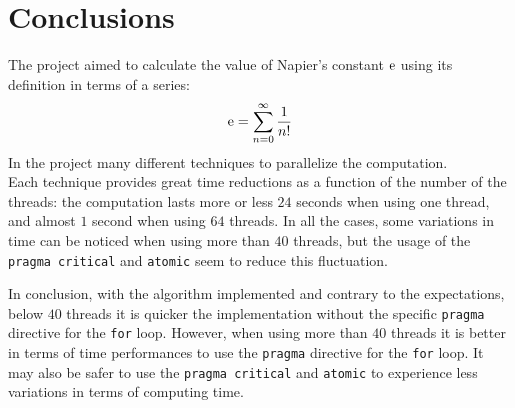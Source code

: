 \documentclass[11pt,a4paper]{article}
\begin{document}
\section{Conclusions}
\par The project aimed to calculate the value of Napier's constant $\operatorname{e}$ using its definition in terms of a series:
$$\operatorname{e} = \sum_{n = 0} ^{\infty} \frac{1}{n!}$$
In the project many different techniques to parallelize the computation.\\
Each technique provides great time reductions as a function of the number of the threads: the computation lasts more or less $24$ seconds when using one thread, and almost $1$ second when using $64$ threads.
In all the cases, some variations in time can be noticed when using more than $40$ threads, but the usage of the \verb+pragma critical+ and \verb+atomic+ seem to reduce this fluctuation.
\par In conclusion, with the algorithm implemented and contrary to the expectations, below $40$ threads it is quicker the implementation without the specific \verb+pragma+ directive for the \verb+for+ loop.
However, when using more than $40$ threads it is better in terms of time performances to use the \verb+pragma+ directive for the \verb+for+ loop.
It may also be safer to use the \verb+pragma critical+ and \verb+atomic+ to experience less variations in terms of computing time.
\end{document}
